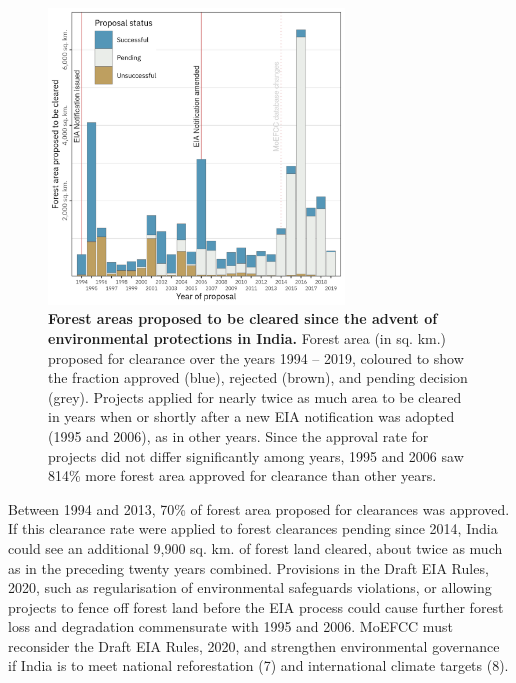 \begin{refsection}
	\begin{figure}[h!]
	    \centering
	    \includegraphics[width=0.7\textwidth]{figures/boxes/clearances.png}
	    \caption{
	        \textbf{Forest areas proposed to be cleared since the advent of environmental protections in India.} 
	        Forest area (in sq. km.) proposed for clearance over the years 1994 -- 2019, coloured to show the fraction approved (blue), rejected (brown), and pending decision (grey). Projects applied for nearly twice as much area to be cleared in years when or shortly after a new EIA notification was adopted (1995 and 2006), as in other years. Since the approval rate for projects did not differ significantly among years, 1995 and 2006 saw 814\% more forest area approved for clearance than other years.
	    }
	    \label{fig_box_clearances}
	\end{figure}

	Between 1994 and 2013, 70\% of forest area proposed for clearances was approved. 
	If this clearance rate were applied to forest clearances pending since 2014, India could see an additional 9,900 sq. km. of forest land cleared, about twice as much as in the preceding twenty years combined. 
	Provisions in the Draft EIA Rules, 2020, such as regularisation of environmental safeguards violations, or allowing projects to fence off forest land before the EIA process could cause further forest loss and degradation commensurate with 1995 and 2006. 
	MoEFCC must reconsider the Draft EIA Rules, 2020, and strengthen environmental governance if India is to meet national reforestation (7) and international climate targets (8).


\end{refsection}
